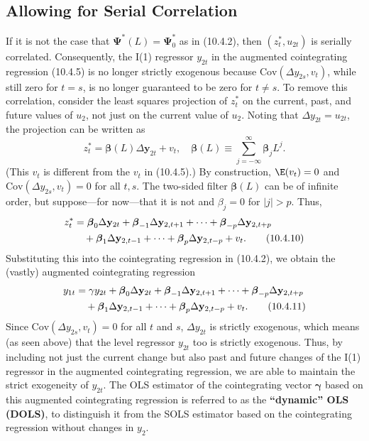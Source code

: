\subsection*{Allowing for Serial Correlation}

If it is not the case that $\boldsymbol{\Psi}^*(L) = \boldsymbol{\Psi}_0^*$ as in (10.4.2), then $(z_t^*, u_{2t})$ is serially corre\-lated.
Consequently, the I(1) regressor $y_{2t}$ in the augmented cointegrating regres\-sion
(10.4.5) is no longer strictly exogenous because $\text{Cov}(\Delta y_{2s}, v_t)$, while still zero
for $t = s$, is no longer guaranteed to be zero for $t \neq s$. To remove this correlation,
consider the least squares projection of $z_t^*$ on the current, past, and future values of
$u_2$, not just on the current value of $u_2$. Noting that $\Delta y_{2t} = u_{2t}$, the projection can
be written as
\begin{equation}
  z_t^* = \boldsymbol{\beta}(L) \Delta \mathbf{y}_{2t} + v_t, \quad
  \boldsymbol{\beta}(L) \equiv \sum_{j=-\infty}^{\infty} \boldsymbol{\beta}_j L^j.
  \label{eq:10.4.9} \tag{10.4.9}
\end{equation}
(This $v_t$ is different from the $v_t$ in (10.4.5).) By construction, $\E(v_t) = 0$ and
$\text{Cov}(\Delta y_{2s}, v_t) = 0$ for all $t, s$. The two-sided filter $\boldsymbol{\beta}(L)$ can be of infinite order,
but suppose---for now---that it is not and $\beta_j = 0$ for $|j| > p$. Thus,
\begin{align}
  z_t^*
  &= \boldsymbol{\beta}_0 \Delta \mathbf{y}_{2t}
    + \boldsymbol{\beta}_{-1} \Delta \mathbf{y}_{2,t+1} + \cdots
    + \boldsymbol{\beta}_{-p} \Delta \mathbf{y}_{2,t+p}
  \notag \\
  &\quad + \boldsymbol{\beta}_1 \Delta \mathbf{y}_{2,t-1} + \cdots
    + \boldsymbol{\beta}_p \Delta \mathbf{y}_{2,t-p} + v_t.
  \label{eq:10.4.10} \tag{10.4.10}
\end{align}
Substituting this into the cointegrating regression in (10.4.2), we obtain the (vastly)
augmented cointegrating regression
\begin{align}
  y_{1t}
  &= \gamma y_{2t}
    + \boldsymbol{\beta}_0 \Delta \mathbf{y}_{2t}
    + \boldsymbol{\beta}_{-1} \Delta \mathbf{y}_{2,t+1} + \cdots
    + \boldsymbol{\beta}_{-p} \Delta \mathbf{y}_{2,t+p}
  \notag \\
  &\quad + \boldsymbol{\beta}_1 \Delta \mathbf{y}_{2,t-1} + \cdots
    + \boldsymbol{\beta}_p \Delta \mathbf{y}_{2,t-p} + v_t.
  \label{eq:10.4.11} \tag{10.4.11}
\end{align}
Since $\text{Cov}(\Delta y_{2s}, v_t) = 0$ for all $t$ and $s$, $\Delta y_{2t}$ is strictly exogenous, which means
(as seen above) that the level regressor $y_{2t}$ too is strictly exogenous. Thus, by
including not just the current change but also past and future changes of the I(1)
regressor in the augmented cointegrating regression, we are able to maintain the
strict exogeneity of $y_{2t}$. The OLS estimator of the cointegrating vector $\boldsymbol{\gamma}$ based
on this augmented cointegrating regression is referred to as the \textbf{``dynamic'' OLS
(DOLS)}, to distinguish it from the SOLS estimator based on the cointegrating
regression without changes in $y_2$.

